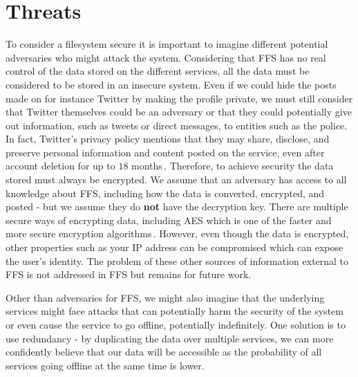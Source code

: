 \section{Threats}
To consider a filesystem secure it is important to imagine different potential adversaries who might attack the system. Considering that FFS has no real control of the data stored on the different services, all the data must be considered to be stored in an insecure system. Even if we could hide the posts made on for instance Twitter by making the profile private, we must still consider that Twitter themselves could be an adversary or that they could potentially give out information, such as tweets or direct messages, to entities such as the police. In fact, Twitter's privacy policy mentions that they may share, disclose, and preserve personal information and content posted on the service, even after account deletion for up to $18$ months\,\cite{TwitterPrivacyPolicy}. Therefore, to achieve security the data stored must always be encrypted. We assume that an adversary has access to all knowledge about FFS, including how the data is converted, encrypted, and posted - but we assume they do \textbf{not} have the decryption key. There are multiple secure ways of encrypting data, including AES which is one of the faster and more secure encryption algorithms\,\cite{mahajanStudyEncryptionAlgorithms2013}. However, even though the data is encrypted, other properties such as your IP address can be compromised which can expose the user's identity. The problem of these other sources of information external to FFS is not addressed in FFS but remains for future work.

Other than adversaries for FFS, we might also imagine that the underlying services might face attacks that can potentially harm the security of the system or even cause the service to go offline, potentially indefinitely. One solution is to use redundancy - by duplicating the data over multiple services, we can more confidently believe that our data will be accessible as the probability of all services going offline at the same time is lower.